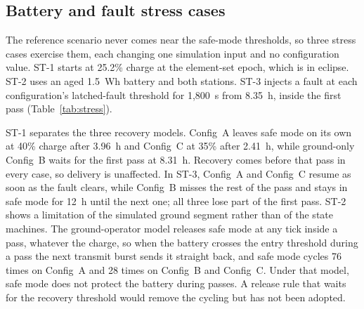 \documentclass[preprint,12pt]{elsarticle}
\newcommand{\cfgA}{Config~A}
\newcommand{\cfgB}{Config~B}
\newcommand{\cfgC}{Config~C}
\begin{document}
\subsection{Battery and fault stress cases}\label{sec:stress}

The reference scenario never comes near the safe-mode thresholds, so three stress cases exercise them, each changing one simulation input and no configuration value. ST-1 starts at 25.2\% charge at the element-set epoch, which is in eclipse. ST-2 uses an aged 1.5~Wh battery and both stations. ST-3 injects a fault at each configuration's latched-fault threshold for 1,800~s from 8.35~h, inside the first pass (Table~\ref{tab:stress}).

\begin{table}[t]
\centering
\small
\caption{Battery and fault stress cases, seed 42.}
\label{tab:stress}
\end{table}

ST-1 separates the three recovery models. \cfgA{} leaves safe mode on its own at 40\% charge after 3.96~h and \cfgC{} at 35\% after 2.41~h, while ground-only \cfgB{} waits for the first pass at 8.31~h. Recovery comes before that pass in every case, so delivery is unaffected. In ST-3, \cfgA{} and \cfgC{} resume as soon as the fault clears, while \cfgB{} misses the rest of the pass and stays in safe mode for 12~h until the next one; all three lose part of the first pass. ST-2 shows a limitation of the simulated ground segment rather than of the state machines. The ground-operator model releases safe mode at any tick inside a pass, whatever the charge, so when the battery crosses the entry threshold during a pass the next transmit burst sends it straight back, and safe mode cycles 76 times on \cfgA{} and 28 times on \cfgB{} and \cfgC{}. Under that model, safe mode does not protect the battery during passes. A release rule that waits for the recovery threshold would remove the cycling but has not been adopted.
\end{document}
